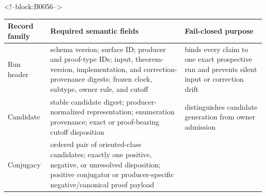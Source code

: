 \documentclass[11pt,a4paper]{article}
\begin{document}
<!--block:B0056-->
\begin{longtable}[]{@{}lll@{}}
\toprule
\begin{minipage}[b]{0.30\columnwidth}\raggedright
Record family\strut
\end{minipage} & \begin{minipage}[b]{0.30\columnwidth}\raggedright
Required semantic fields\strut
\end{minipage} & \begin{minipage}[b]{0.30\columnwidth}\raggedright
Fail-closed purpose\strut
\end{minipage}\tabularnewline
\midrule
\endhead
\begin{minipage}[t]{0.30\columnwidth}\raggedright
Run header\strut
\end{minipage} & \begin{minipage}[t]{0.30\columnwidth}\raggedright
schema version; surface ID; producer and proof-type IDs; input, theorem-version, implementation, and correction-provenance digests; frozen clock, subtype, owner rule, and cutoff\strut
\end{minipage} & \begin{minipage}[t]{0.30\columnwidth}\raggedright
binds every claim to one exact prospective run and prevents silent input or correction drift\strut
\end{minipage}\tabularnewline
\begin{minipage}[t]{0.30\columnwidth}\raggedright
Candidate\strut
\end{minipage} & \begin{minipage}[t]{0.30\columnwidth}\raggedright
stable candidate digest; producer-normalized representation; enumeration provenance; exact or proof-bearing cutoff disposition\strut
\end{minipage} & \begin{minipage}[t]{0.30\columnwidth}\raggedright
distinguishes candidate generation from owner admission\strut
\end{minipage}\tabularnewline
\begin{minipage}[t]{0.30\columnwidth}\raggedright
Conjugacy\strut
\end{minipage} & \begin{minipage}[t]{0.30\columnwidth}\raggedright
ordered pair of oriented-class candidates; exactly one positive, negative, or unresolved disposition; positive conjugator or producer-specific negative/canonical proof payload\strut
\end{minipage} & \begin{minipage}[t]{0.30\columnwidth}\raggedright

\end{minipage}
\end{longtable}
\end{document}
